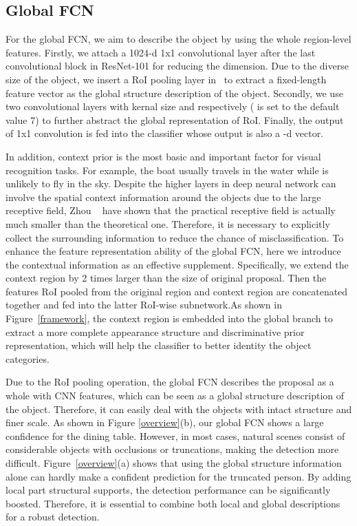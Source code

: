 \documentclass[10pt,twocolumn,letterpaper]{article}
\begin{document}
\subsection{Global FCN}
For the global FCN, we aim to describe the object by using the whole region-level features. Firstly, we attach a 1024-d 1x1 convolutional layer after the last convolutional block in ResNet-101 for reducing the dimension. Due to the diverse size of the object, we insert a RoI pooling layer in~\cite{girshick2015fast} to extract a fixed-length feature vector as the global structure description of the object. Secondly, we use two convolutional layers with kernal size  and  respectively ( is set to the default value 7) to further abstract the global representation of RoI. Finally, the output of 1x1 convolution is fed into the classifier whose output is also a -d vector.

In addition, context prior is the most basic and important factor for visual recognition tasks. For example, the boat usually travels in the water while is unlikely to fly in the sky. Despite the higher layers in deep neural network can involve the spatial context information around the objects due to the large receptive field, Zhou \etal~\cite{zhou2014object} have shown that the practical receptive field is actually much smaller than the theoretical one. Therefore, it is necessary to explicitly collect the surrounding information to reduce the chance of misclassification. To enhance the feature representation ability of the global FCN, here we introduce the contextual information as an effective supplement. Specifically, we extend the context region by 2 times larger than the size of original proposal. Then the features RoI pooled from the original region and context region are concatenated together and fed into the latter RoI-wise subnetwork.As shown in Figure~\ref{framework}, the context region is embedded into the global branch to extract a more complete appearance structure and discriminative prior representation, which will help the classifier to better identity the object categories.

Due to the RoI pooling operation, the global FCN describes the proposal as a whole with CNN features, which can be seen as a global structure description of the object. Therefore, it can easily deal with the objects with intact structure and finer scale. As shown in Figure \ref{overview}(b), our global FCN shows a large confidence for the dining table. However, in most cases, natural scenes consist of considerable objects with occlusions or truncations, making the detection more difficult. Figure~\ref{overview}(a) shows that using the global structure information alone can hardly make a confident prediction for the truncated person. By adding local part structural supports, the detection performance can be significantly boosted. Therefore, it is essential to combine both local and global descriptions for a robust detection.
\end{document}
